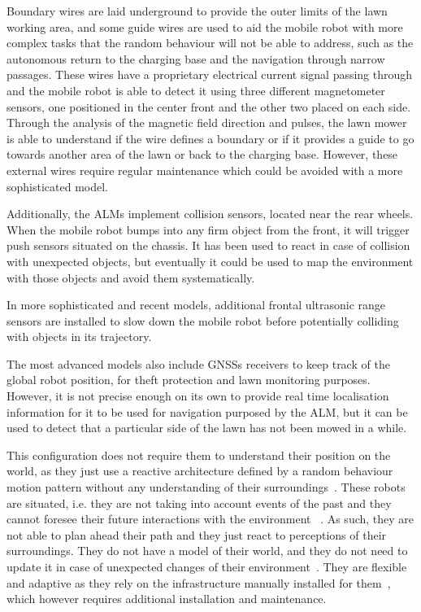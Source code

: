 Boundary wires are laid underground to provide the outer limits of the lawn working area, and some guide wires are used to aid the mobile robot with more complex tasks that the random behaviour will not be able to address, such as the autonomous return to the charging base and the navigation through narrow passages. 
These wires have a proprietary electrical current signal passing through and the mobile robot is able to detect it using three different magnetometer sensors, one positioned in the center front and the other two placed on each side.
Through the analysis of the magnetic field direction and pulses, the lawn mower is able to understand if the wire defines a boundary or if it provides a guide to go towards another area of the lawn or back to the charging base.
However, these external wires require regular maintenance which could be avoided with a more sophisticated model.

Additionally, the \gls{ALM}s implement collision sensors, located near the rear wheels.
When the mobile robot bumps into any firm object from the front, it will trigger push sensors situated on the chassis.
It has been used to react in case of collision with unexpected objects, but eventually it could be used to map the environment with those objects and avoid them systematically.

In more sophisticated and recent models, additional frontal ultrasonic range sensors are installed to slow down the mobile robot before potentially colliding with objects in its trajectory.

The most advanced models also include \Glspl{GNSS} receivers to keep track of the global robot position, for theft protection and lawn monitoring purposes.
However, it is not precise enough on its own to provide real time localisation information for it to be used for navigation purposed by the \gls{ALM}, but it can be used to detect that a particular side of the lawn has not been mowed in a while.%

This configuration does not require them to understand their position on the world, as they just use a reactive architecture defined by a random behaviour motion pattern without any understanding of their surroundings~\cite{wooldridge_agent_1995}.
These robots are situated, i.e. they are not taking into account events of the past and they cannot foresee their future interactions with the environment  ~\cite{muller_1999}. 
As such, they are not able to plan ahead their path and they just react to perceptions of their surroundings.
They do not have a model of their world, and they do not need to update it in case of unexpected changes of their environment~\cite{wooldridge_agent_1995}. 
They are flexible and adaptive as they rely on the infrastructure manually installed for them~\cite{wahde2012introduction},  which however requires additional installation and maintenance.


